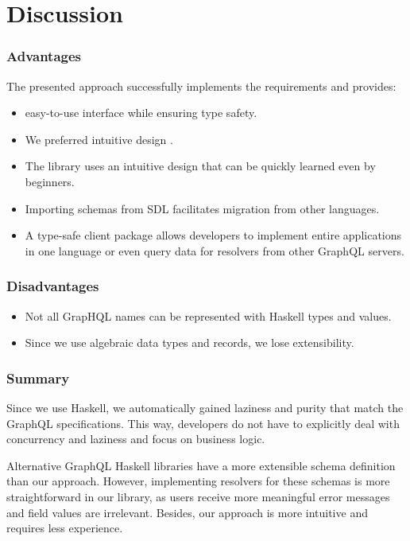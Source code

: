 \section{Discussion}



    
\begin{frame}\frametitle{Advantages}

The presented approach successfully implements the requirements and provides:

\begin{itemize}
    \item easy-to-use interface while ensuring type safety.
    \item We preferred intuitive design .
    \item The library uses an intuitive design that can be quickly learned even by beginners.
    \item Importing schemas from SDL facilitates migration from other languages.
    \item A type-safe client package allows developers to implement entire applications in one language or even query data for resolvers from other GraphQL servers.
\end{itemize}

\end{frame}

\begin{frame}\frametitle{Disadvantages}

\begin{itemize}
    \item Not all GrapHQL names can be represented with Haskell types and values.
    \item Since we use algebraic data types and records, we lose extensibility.
\end{itemize}

\end{frame}

\begin{frame}\frametitle{Summary}
    
    Since we use Haskell, we automatically gained laziness and purity that match the GraphQL specifications. This way, developers do not have to explicitly deal with concurrency and laziness and focus on business logic. 

    Alternative GraphQL Haskell libraries have a more extensible schema definition than our approach. However, implementing resolvers for these schemas is more straightforward in our library, as users receive more meaningful error messages and field values are irrelevant. Besides, our approach is more intuitive and requires less experience.
    
\end{frame}

